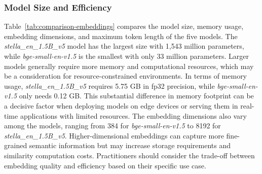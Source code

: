 \subsubsection{Model Size and Efficiency}
Table~\ref{tab:comparison-embeddings} compares the model size, memory usage, embedding dimensions, and maximum token length of the five models. 
The \textit{stella\_en\_1.5B\_v5} model has the largest size with 1,543 million parameters, while \textit{bge-small-en-v1.5} is the smallest with only 33 million parameters.
Larger models generally require more memory and computational resources, which may be a consideration for resource-constrained environments.
In terms of memory usage, \textit{stella\_en\_1.5B\_v5} requires 5.75 GB in fp32 precision, while \textit{bge-small-en-v1.5} only needs 0.12 GB.
This substantial difference in memory footprint can be a decisive factor when deploying models on edge devices or serving them in real-time applications with limited resources.
The embedding dimensions also vary among the models, ranging from 384 for \textit{bge-small-en-v1.5} to 8192 for \textit{stella\_en\_1.5B\_v5}.
Higher-dimensional embeddings can capture more fine-grained semantic information but may increase storage requirements and similarity computation costs.
Practitioners should consider the trade-off between embedding quality and efficiency based on their specific use case.

\begin{table}[ht!]
    \centering
    \noindent
    \caption{Comparison of characteristics of embedding models}
    \label{tab:comparison-embeddings}
\end{table}

